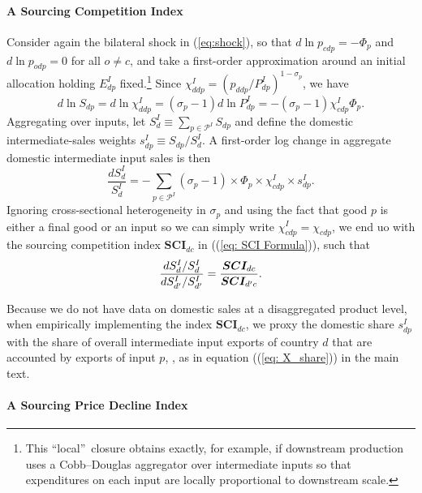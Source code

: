 \documentclass[english,12pt]{article}
\theoremstyle{definition}
\let\oldref\ref
\renewcommand{\ref}[1]{(\oldref{#1})}
\begin{document}
\paragraph{A Sourcing Competition Index}

Consider again the bilateral shock in \ref{eq:shock}, so that $d\ln
p_{cdp}=-\Phi _{p}$ and $d\ln p_{odp}=0$ for all $o\neq c$, and take a
first-order approximation around an initial allocation holding $E_{dp}^{I}$
fixed.\footnote{%
This \textquotedblleft local\textquotedblright\ closure obtains exactly, for
example, if downstream production uses a Cobb--Douglas aggregator over
intermediate inputs so that expenditures on each input are locally
proportional to downstream scale.} Since $\chi
_{ddp}^{I}=(p_{ddp}/P_{dp}^{I})^{1-\sigma _{p}}$, we have 
\begin{equation*}
d\ln S_{dp}=d\ln \chi _{ddp}^{I}=(\sigma _{p}-1)d\ln P_{dp}^{I}=-(\sigma
_{p}-1)\chi _{cdp}^{I}\Phi _{p}.
\end{equation*}%
Aggregating over inputs, let $S_{d}^{I}\equiv \sum_{p\in \mathcal{P}%
^{I}}S_{dp}$ and define the domestic intermediate-sales weights $%
s_{dp}^{I}\equiv S_{dp}/S_{d}^{I}$. A first-order log change in aggregate
domestic intermediate input sales is then 
\begin{equation*}
\frac{dS_{d}^{I}}{S_{d}^{I}}=-\sum_{p\in \mathcal{P}^{I}}(\sigma
_{p}-1)\times \Phi _{p}\times \chi _{cdp}^{I}\times s_{dp}^{I}.
\end{equation*}%
Ignoring cross-sectional heterogeneity in $\sigma _{p}$ and using the fact
that good $p$ is either a final good or an input so we can simply write $%
\chi _{cdp}^{I}=\chi _{cdp}$, we end uo with the sourcing competition index $%
\boldsymbol{SCI}_{dc}$ in (\ref{eq: SCI Formula}), such that 
\begin{equation*}
\frac{dS_{d}^{I}/S_{d}^{I}}{dS_{d^{\prime }}^{I}/S_{d^{\prime }}^{I}}=\frac{%
\boldsymbol{SCI}_{dc}}{\boldsymbol{SCI}_{d^{\prime }c}}\text{.}
\end{equation*}

Because we do not have data on domestic sales at a disaggregated product
level, when empirically implementing the index $\boldsymbol{SCI}_{dc}$, we
proxy the domestic share $s_{dp}^{I}$with the share of overall intermediate
input exports of country $d$ that are accounted by exports of input $p$, ,
as in equation (\ref{eq: X_share}) in the main text.

\paragraph{A Sourcing Price Decline Index}
\end{document}

